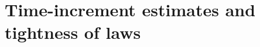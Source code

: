 \documentclass[11pt, reqno]{amsart}
\theoremstyle{definition}
\newtheorem{lemma}[theorem]{Lemma}
\numberwithin{equation}{section}
\newcommand{\bff}{\boldsymbol}
\newcommand{\bb}{\mathbb}
\newcommand{\norm}[2]{\left\|{#1}\right\|_{#2}}
\begin{document}
\section{Time-increment estimates and tightness of laws}


%
\end{document}
